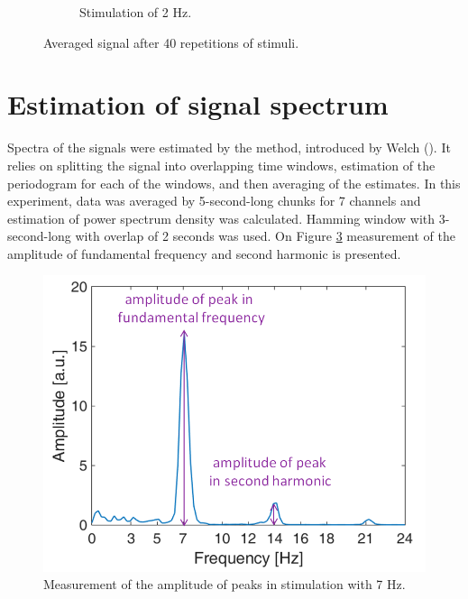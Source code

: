 \documentclass{pracalicmgr}
\begin{document}
\begin{figure}[H]
\begin{subfigure}{.5\textwidth}
	\caption{Stimulation of 2 Hz.}
	\label{rys:piki_2Hz}
	\end{subfigure}
	\caption{Averaged signal after 40 repetitions of stimuli.}
	\label{rys:piki}
	\end{figure}


	\section{Estimation of signal spectrum}
	Spectra of the signals were estimated by the method, introduced by Welch (\cite{welch}). It relies  on splitting the signal into overlapping time windows, estimation of the periodogram for each of the windows, and then averaging of the estimates. In this experiment, data was averaged by 5-second-long chunks for 7 channels and estimation of power spectrum density was calculated. Hamming window with 3-second-long with overlap of 2 seconds was used. On Figure \ref{rys:pik_widmo} measurement of the amplitude of fundamental frequency and second harmonic is presented.

	\begin{figure}[H]
	\centering
	\includegraphics[scale=0.5]{pik_widmo2.png}
	\caption{Measurement of the amplitude of peaks in stimulation with 7 Hz.}
	\label{rys:pik_widmo}
	\end{figure}

    
\end{document}
